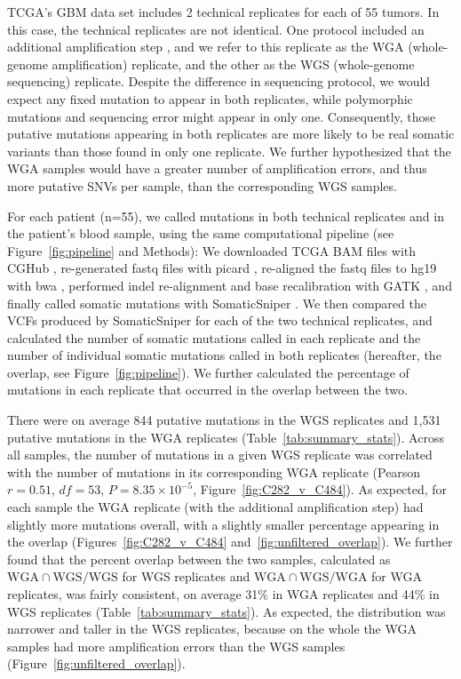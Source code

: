 \documentclass[11 pt]{article} %
\begin{document}
TCGA's GBM data set includes 2 technical replicates for each of 55 tumors. In this case, the technical replicates are not identical. One protocol included an additional amplification step \citep{TCGA-GBM}, and we refer to this replicate as the WGA (whole-genome amplification) replicate, and the other as the WGS (whole-genome sequencing) replicate. Despite the difference in sequencing protocol, we would expect any fixed mutation to appear in both replicates, while polymorphic mutations and sequencing error might appear in only one. Consequently, those putative mutations appearing in both replicates are more likely to be real somatic variants than those found in only one replicate. We further hypothesized that the WGA samples would have a greater number of amplification errors, and thus more putative SNVs per sample, than the corresponding WGS samples. 

For each patient (n=55), we called mutations in both technical replicates and in the patient's blood sample, using the same computational pipeline (see Figure~\ref{fig:pipeline} and Methods): We downloaded TCGA BAM files with CGHub \citep{CGHub}, re-generated fastq files with picard \citep{picard}, re-aligned the fastq files to hg19 with bwa \citep{bwa}, performed indel re-alignment and base recalibration with GATK \citep{GATK}, and finally called somatic mutations with SomaticSniper \citep{SomaticSniper}. We then compared the VCFs produced by SomaticSniper for each of the two technical replicates, and calculated the number of somatic mutations called in each replicate and the number of individual somatic mutations called in both replicates (hereafter, the overlap, see Figure~\ref{fig:pipeline}). We further calculated the percentage of mutations in each replicate that occurred in the overlap between the two. 

There were on average 844 putative mutations in the WGS replicates and 1,531 putative mutations in the WGA replicates (Table~\ref{tab:summary_stats}). Across all samples, the number of mutations in a given WGS replicate was correlated with the number of mutations in its corresponding WGA replicate (Pearson $r=0.51$, $df=53$, $P=8.35\times10^{-5}$, Figure~\ref{fig:C282_v_C484}). As expected, for each sample the WGA replicate (with the additional amplification step) had slightly more mutations overall, with a slightly smaller percentage appearing in the overlap (Figures~\ref{fig:C282_v_C484} and~\ref{fig:unfiltered_overlap}). We further found that the percent overlap between the two samples, calculated as $\text{WGA} \cap \text{WGS}/\text{WGS}$ for WGS replicates and $\text{WGA} \cap \text{WGS}/\text{WGA}$ for WGA replicates, was fairly consistent, on average 31\% in WGA replicates and 44\% in WGS replicates (Table~\ref{tab:summary_stats}). As expected, the distribution was narrower and taller in the WGS replicates, because on the whole the WGA samples had more amplification errors than the WGS samples (Figure~\ref{fig:unfiltered_overlap}).
\end{document}

